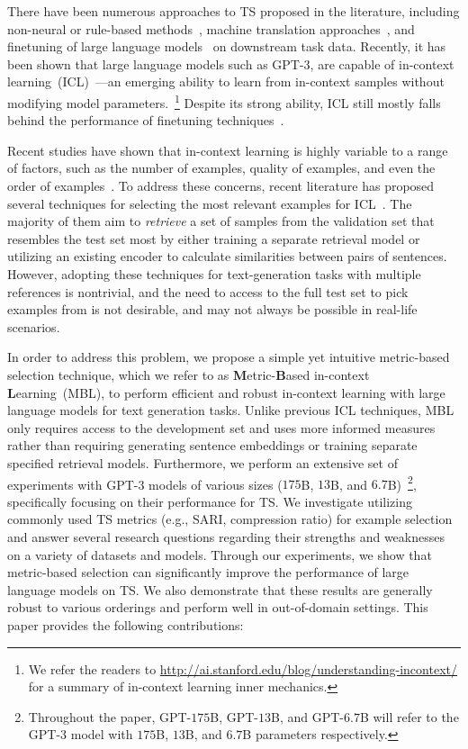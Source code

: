 \documentclass[11pt]{article}
\begin{document}
There have been numerous approaches to TS proposed in the literature, including non-neural or rule-based methods~\citep{NassarAH19}, machine translation approaches~\citep{xu-etal-2016-optimizing}, and finetuning of large language models~\citep{sheang-saggion-2021-controllable} on downstream task data. Recently, it has been shown that large language models such as GPT-3, are capable of in-context learning~(ICL)~\cite{brown2020language}---an emerging ability to learn from in-context samples without modifying model parameters.~\footnote{We refer the readers to \url{http://ai.stanford.edu/blog/understanding-incontext/} for a summary of in-context learning inner mechanics.} Despite its strong ability, ICL still mostly falls behind the performance of finetuning techniques~\citep{surveyICL}. 



Recent studies have shown that in-context learning is highly variable to a range of factors, such as the number of examples, quality of examples, and even the order of examples~\citep{lu-etal-2022-fantastically,kategpt,surveyICL}. To address these concerns, recent literature has proposed several techniques for selecting the most relevant examples for ICL~\citep{kategpt, SorensenRRSRDKF22,Gonen22,rubin-etal-2022-learning}. The majority of them aim to \textit{retrieve} a set of samples from the validation set that resembles the test set most by either training a separate retrieval model or utilizing an existing encoder to calculate similarities between pairs of sentences. However, adopting these techniques for text-generation tasks with multiple references is nontrivial, and the need to access to the full test set to pick examples from is not desirable, and may not always be possible in real-life scenarios.   



In order to address this problem, we propose a simple yet intuitive metric-based selection technique, which we refer to as \textbf{M}etric-\textbf{B}ased in-context \textbf{L}earning~(MBL), to perform efficient and robust in-context learning with large language models for text generation tasks. Unlike previous ICL techniques, MBL only requires access to the development set and uses more informed measures rather than requiring generating sentence embeddings or training separate specified retrieval models. Furthermore, we perform an extensive set of experiments with GPT-3 models of various sizes ($175$B, $13$B, and $6.7$B)~\footnote{Throughout the paper, GPT-$175$B, GPT-$13$B, and GPT-$6.7$B will refer to the GPT-$3$ model with $175$B, $13$B, and $6.7$B parameters respectively.}, specifically focusing on their performance for TS. We investigate utilizing commonly used TS metrics (e.g., SARI, compression ratio) for example selection and answer several research questions regarding their strengths and weaknesses on a variety of datasets and models. Through our experiments, we show that metric-based selection can significantly improve the performance of large language models on TS. We also demonstrate that these results are generally robust to various orderings and perform well in out-of-domain settings. This paper provides the following contributions:
\end{document}
